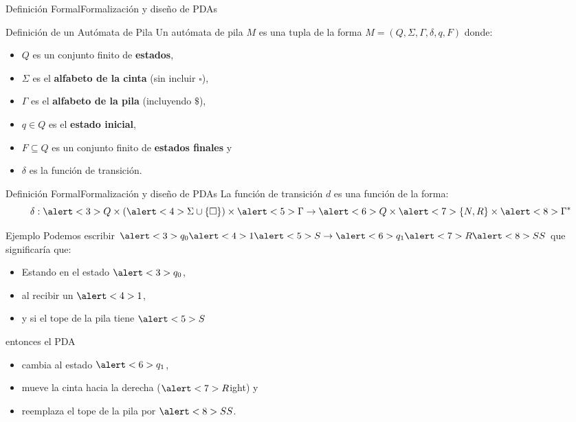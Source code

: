 \documentclass[spanish]{beamer}
\begin{document}
\begin{frame}{Definición Formal}{Formalización y diseño de PDAs}
    \begin{block}{Definición de un Autómata de Pila}
        Un autómata de pila $M$ es una tupla de la forma $M = (Q, \Sigma, \Gamma, \delta, q, F)$ donde: \pause
        \begin{itemize}
            \item $Q$ es un conjunto finito de \textbf{estados}, \pause
            \item $\Sigma$ es el \textbf{alfabeto de la cinta} (sin incluir $\square$), \pause
            \item $\Gamma$ es el \textbf{alfabeto de la pila} (incluyendo $\$$), \pause
            \item $q \in Q$ es el \textbf{estado inicial}, \pause
            \item $F \subseteq Q$ es un conjunto finito de \textbf{estados finales} y \pause
            \item $\delta$ es la función de transición.
        \end{itemize}
    \end{block}
\end{frame}

\begin{frame}{Definición Formal}{Formalización y diseño de PDAs}
    La función de transición $d$ es una función de la forma:
        \[\delta : \alert<3>{Q} \times (\alert<4>{\Sigma \cup \{\square\}}) \times \alert<5>{\Gamma} \to \alert<6>{Q} \times \alert<7>{\{N,R\}} \times \alert<8>{\Gamma^*}\] \pause
        \vspace{-1.5ex}
    \begin{exampleblock}{Ejemplo}
        Podemos escribir $\alert<3>{q_0} \alert<4>{1} \alert<5>{S} \to \alert<6>{q_1} \alert<7>{R} \alert<8>{SS}$ que significaría que: \pause
        \begin{itemize}
            \item Estando en el estado $\alert<3>{q_0}$, \pause
            \item al recibir un $\alert<4>{1}$, \pause
            \item y si el tope de la pila tiene $\alert<5>{S}$ \pause
        \end{itemize}
        entonces el PDA
        \begin{itemize}
            \item cambia al estado $\alert<6>{q_1}$, \pause
            \item mueve la cinta hacia la derecha ($\alert<7>{R}$ight) y \pause
            \item reemplaza el tope de la pila por $\alert<8>{SS}$.
        \end{itemize}
    \end{exampleblock}
\end{frame}
\end{document}
